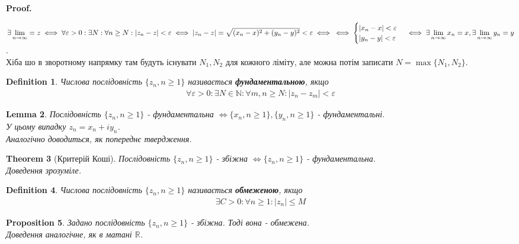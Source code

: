 \documentclass[a4paper, 10pt]{article}
\makeatletter
\def\qed{$\blacksquare$}
\theoremstyle{theoremdd}
\newtheorem{theorem}{Theorem}[subsection]
\theoremstyle{theoremdd}
\newtheorem{definition}[theorem]{Definition}
\theoremstyle{theoremdd}
\theoremstyle{theoremdd}
\theoremstyle{theoremdd}
\newtheorem{proposition}[theorem]{Proposition}
\theoremstyle{theoremdd}
\theoremstyle{theoremdd}
\newtheorem{lemma}[theorem]{Lemma}
\theoremstyle{theoremdd}
\renewenvironment{proof}[1][Proof.\\]{\par
\pushQED{\hfill \qed}%
\normalfont \topsep6\p@\@plus6\p@\relax
\trivlist
\item\relax
{\bfseries
#1\@addpunct{.}}\hspace\labelsep\ignorespaces
}{%
\popQED\endtrivlist\@endpefalse
}
\makeatother
\begin{document}
\begin{proof}
$\exists \displaystyle\lim_{n \to \infty} = z \iff \forall \varepsilon > 0: \exists N: \forall n \geq N: |z_n-z| < \varepsilon \iff |z_n-z| = \sqrt{(x_n-x)^2 + (y_n-y)^2} < \varepsilon \iff \\ \iff \begin{cases} |x_n-x| < \varepsilon \\ |y_n-y| < \varepsilon \end{cases} \iff \exists \displaystyle \lim_{n \to \infty} x_n = x, \exists \lim_{n \to \infty} y_n = y$.\\
Хіба шо в зворотному напрямку там будуть існувати $N_1,N_2$ для кожного ліміту, але можна потім записати $N = \max\{N_1,N_2\}$.
\end{proof}

\begin{definition}
Числова послідовність $\{z_n, n \geq 1\}$ називається \textbf{фундаментальною}, якщо
\begin{align*}
\forall \varepsilon > 0: \exists N \in \mathbb{N}: \forall m,n \geq N: |z_n-z_m| < \varepsilon
\end{align*}
\end{definition}

\begin{lemma}
Послідовність $\{z_n, n \geq 1\}$ - фундаментальна $\iff \{x_n, n \geq 1\}, \{y_n,n \geq 1\}$ - фундаментальні.\\
У цьому випадку $z_n = x_n + iy_n$.\\
\textit{Аналогічно доводиться, як попереднє твердження.}
\end{lemma}

\begin{theorem}[Критерій Коші]
Послідовність $\{z_n, n \geq 1\}$ - збіжна $\iff \{z_n, n \geq 1\}$ - фундаментальна.\\
\textit{Доведення зрозуміле.}
\end{theorem}

\begin{definition}
Числова послідовність $\{z_n, n \geq 1\}$ називається \textbf{обмеженою}, якщо
\begin{align*}
\exists C > 0: \forall n \geq 1: |z_n| \leq M
\end{align*}
\end{definition}

\begin{proposition}
Задано послідовність $\{z_n, n \geq 1\}$ - збіжна. Тоді вона - обмежена.\\
\textit{Доведення аналогічне, як в матані $\mathbb{R}$.}
\end{proposition}
\end{document}
